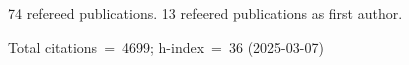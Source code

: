 74 refereed publications. 13 refeered publications as first author.

Total citations~=~4699; h-index~=~36 (2025-03-07)